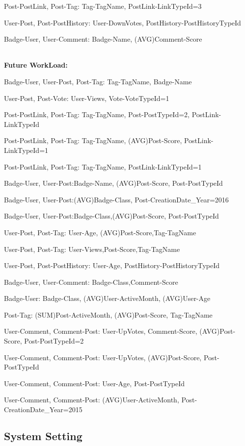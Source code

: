 Post-PostLink, Post-Tag: Tag-TagName, PostLink-LinkTypeId=3

User-Post, Post-PostHistory: User-DownVotes, PostHistory-PostHistoryTypeId

Badge-User, User-Comment: Badge-Name, (AVG)Comment-Score


\\\textbf{Future WorkLoad:}

Badge-User, User-Post, Post-Tag: Tag-TagName, Badge-Name

User-Post, Post-Vote: User-Views, Vote-VoteTypeId=1

Post-PostLink, Post-Tag: Tag-TagName, Post-PostTypeId=2, PostLink-LinkTypeId

Post-PostLink, Post-Tag: Tag-TagName, (AVG)Post-Score, PostLink-LinkTypeId=1

Post-PostLink, Post-Tag: Tag-TagName, PostLink-LinkTypeId=1

Badge-User, User-Post:Badge-Name, (AVG)Post-Score, Post-PostTypeId

Badge-User, User-Post:(AVG)Badge-Class, Post-CreationDate\_Year=2016

Badge-User, User-Post:Badge-Class,(AVG)Post-Score, Post-PostTypeId

User-Post, Post-Tag: User-Age, (AVG)Post-Score,Tag-TagName

User-Post, Post-Tag: User-Views,Post-Score,Tag-TagName



User-Post, Post-PostHistory: User-Age, PostHistory-PostHistoryTypeId

Badge-User, User-Comment: Badge-Class,Comment-Score



Badge-User: Badge-Class, (AVG)User-ActiveMonth, (AVG)User-Age

Post-Tag: (SUM)Post-ActiveMonth, (AVG)Post-Score, Tag-TagName

User-Comment, Comment-Post: User-UpVotes, Comment-Score, (AVG)Post-Score, Post-PostTypeId=2

User-Comment, Comment-Post: User-UpVotes, (AVG)Post-Score, Post-PostTypeId

User-Comment, Comment-Post: User-Age, Post-PostTypeId

User-Comment, Comment-Post: (AVG)User-ActiveMonth, Post-CreationDate\_Year=2015


\subsection{System Setting}

